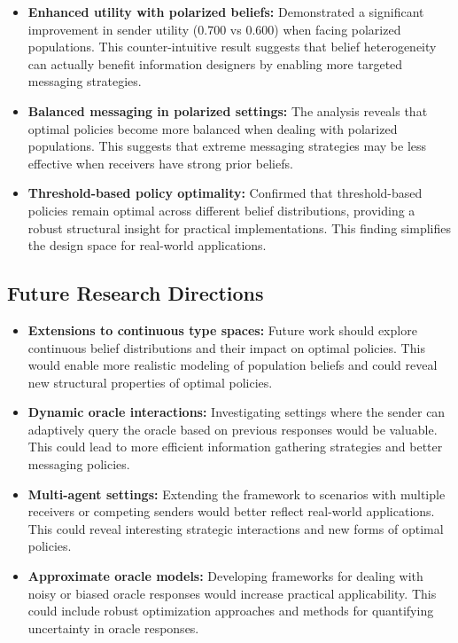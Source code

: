 \documentclass[12pt]{article}
\begin{document}
\begin{itemize}
    \item \textbf{Enhanced utility with polarized beliefs:} Demonstrated a significant improvement in sender utility (0.700 vs 0.600) when facing polarized populations. This counter-intuitive result suggests that belief heterogeneity can actually benefit information designers by enabling more targeted messaging strategies.
    
    \item \textbf{Balanced messaging in polarized settings:} The analysis reveals that optimal policies become more balanced when dealing with polarized populations. This suggests that extreme messaging strategies may be less effective when receivers have strong prior beliefs.
    
    \item \textbf{Threshold-based policy optimality:} Confirmed that threshold-based policies remain optimal across different belief distributions, providing a robust structural insight for practical implementations. This finding simplifies the design space for real-world applications.
\end{itemize}

\subsection{Future Research Directions}
\begin{itemize}
    \item \textbf{Extensions to continuous type spaces:} Future work should explore continuous belief distributions and their impact on optimal policies. This would enable more realistic modeling of population beliefs and could reveal new structural properties of optimal policies.
    
    \item \textbf{Dynamic oracle interactions:} Investigating settings where the sender can adaptively query the oracle based on previous responses would be valuable. This could lead to more efficient information gathering strategies and better messaging policies.
    
    \item \textbf{Multi-agent settings:} Extending the framework to scenarios with multiple receivers or competing senders would better reflect real-world applications. This could reveal interesting strategic interactions and new forms of optimal policies.
    
    \item \textbf{Approximate oracle models:} Developing frameworks for dealing with noisy or biased oracle responses would increase practical applicability. This could include robust optimization approaches and methods for quantifying uncertainty in oracle responses.
\end{itemize}
\end{document}
